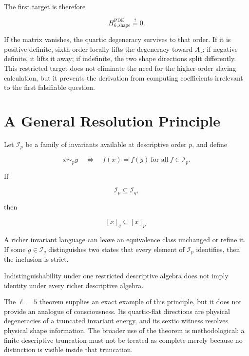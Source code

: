 The first target is therefore

\[
\boxed{
H_{6,\mathrm{shape}}^{\mathrm{PDE}}\stackrel{?}{=}0.
}
\]

If the matrix vanishes, the quartic degeneracy survives to that order. If it is positive definite, sixth order locally lifts the degeneracy toward $A_\star$; if negative definite, it lifts it away; if indefinite, the two shape directions split differently. This restricted target does not eliminate the need for the higher-order slaving calculation, but it prevents the derivation from computing coefficients irrelevant to the first falsifiable question.

\section{A General Resolution Principle}

Let $\mathcal I_p$ be a family of invariants available at descriptive order $p$, and define

\[
x\sim_p y
\quad\Longleftrightarrow\quad
f(x)=f(y)\ \text{for all}\ f\in\mathcal I_p.
\]

If

\[
\mathcal I_p\subseteq\mathcal I_q,
\]

then

\[
[x]_q\subseteq[x]_p.
\]

A richer invariant language can leave an equivalence class unchanged or refine it. If some $g\in\mathcal I_q$ distinguishes two states that every element of $\mathcal I_p$ identifies, then the inclusion is strict.

\begin{principle}
Indistinguishability under one restricted descriptive algebra does not imply identity under every richer descriptive algebra.
\end{principle}

The $\ell=5$ theorem supplies an exact example of this principle, but it does not provide an analogue of consciousness. Its quartic-flat directions are physical degeneracies of a truncated invariant energy, and its sextic witness resolves physical shape information. The broader use of the theorem is methodological: a finite descriptive truncation must not be treated as complete merely because no distinction is visible inside that truncation.
